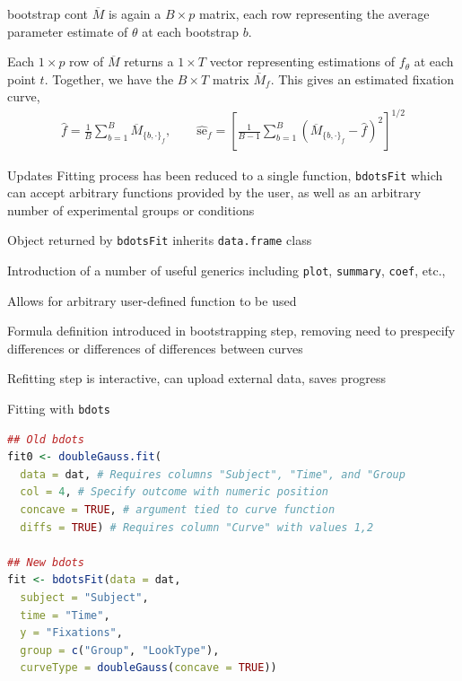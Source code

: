 \documentclass{beamer}
\begin{document}
\begin{frame}{bootstrap cont}
$\overline{M}$ is again a $B \times p$ matrix, each row  representing the average parameter estimate of $\theta$ at each bootstrap $b$. \newline 

Each $1\times p$ row of $\overline{M}$ returns a $1 \times T$ vector representing estimations of $f_{\theta}$ at each point $t$. Together, we have the $B \times T$ matrix $\overline{M}_f$. This gives an estimated fixation curve, 
\begin{align*}
\hat{f} = \frac1B \sum_{b=1}^B \overline{M}_{\{b, \cdot\}_f}, \qquad \widehat{\text{se}}_{f} = \left[ \frac{1}{B-1} \sum_{b=1}^B \left( \overline{M}_{\{b, \cdot\}_{f}} - \hat{f} \right)^2 \right]^{1/2} 
\end{align*}
\end{frame}



\begin{frame}{Updates}
Fitting process has been reduced to a single function, \texttt{bdotsFit} which can accept arbitrary functions provided by the user, as well as an arbitrary number of experimental groups or conditions \newline

Object returned by \texttt{bdotsFit} inherits \texttt{data.frame} class \newline

Introduction of a number of useful generics including \texttt{plot}, \texttt{summary}, \texttt{coef}, etc., \newline 

Allows for arbitrary user-defined function to be used \newline 

Formula definition introduced in bootstrapping step, removing need to prespecify differences or differences of differences between curves \newline 

Refitting step is interactive, can upload external data, saves progress \newline 

\end{frame}



\begin{frame}[fragile]{Fitting with \texttt{bdots}}
\lstset{basicstyle=\footnotesize\ttfamily, style = rstyle}
\begin{lstlisting}[language=R, showstringspaces=false]
## Old bdots
fit0 <- doubleGauss.fit(
  data = dat, # Requires columns "Subject", "Time", and "Group
  col = 4, # Specify outcome with numeric position
  concave = TRUE, # argument tied to curve function
  diffs = TRUE) # Requires column "Curve" with values 1,2
  
## New bdots
fit <- bdotsFit(data = dat,
  subject = "Subject",
  time = "Time",
  y = "Fixations",
  group = c("Group", "LookType"),
  curveType = doubleGauss(concave = TRUE))
\end{lstlisting}
\end{frame}
\end{document}
